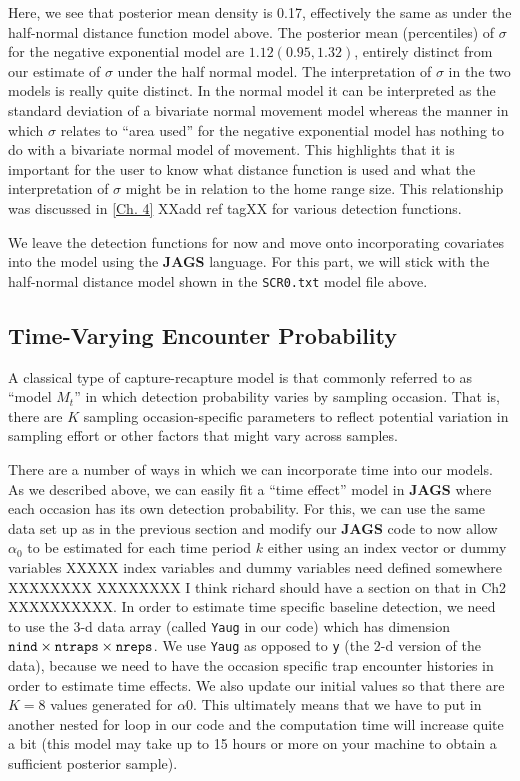 Here, we see that posterior mean density is 0.17,
effectively the same as under the half-normal distance function model
above.  The posterior mean (percentiles) of $\sigma$ for the negative
exponential model are $1.12 (0.95, 1.32)$, entirely distinct from our
estimate of $\sigma$ under the half normal model. The interpretation
of $\sigma$ in the two models is really quite distinct. In the normal
model it can be interpreted as the standard deviation of a bivariate
normal movement model whereas the manner in which $\sigma$ relates to
``area used'' for the negative exponential model has nothing to do
with a bivariate normal model of movement.  This highlights that it is
important for the user to know what distance function is used and what
the interpretation of $\sigma$ might be in relation to the home range size.
This relationship was discussed in \ref{Ch. 4}
XXadd ref tagXX for various detection functions.


We leave the detection functions for now and move onto incorporating
covariates into the model using the {\bf JAGS}
language.  For this part, we will stick with the half-normal distance
model shown in the \mbox{\tt SCR0.txt} model file above.

\subsection{Time-Varying Encounter Probability}

A classical type of capture-recapture model is that commonly referred
to as ``model $M_{t}$'' \citep{otis_etal:1978} in which detection probability varies by
sampling occasion. That is, there are $K$ sampling occasion-specific
parameters to reflect potential variation in sampling effort or other
factors that might vary across samples.

There are a number of ways in which we can incorporate time into our
models.  As we described above, we can easily fit a ``time effect'' model in {\bf JAGS}
where each occasion has its own detection probability.
For this, we can use the same data set up as in the previous
section and modify our {\bf JAGS} code to now allow $\alpha_0$ to be
estimated for each time period $k$ either using an index vector or
dummy variables XXXXX index variables and dummy variables need defined
somewhere XXXXXXXX XXXXXXXX I think richard should have a section on that in Ch2 XXXXXXXXXX.  In order to estimate time
specific baseline detection, we need to use the 3-d data array (called \mbox{\tt Yaug} in our
code) which
has dimension
$\mbox{\tt nind} \times \mbox{\tt ntraps} \times \mbox{\tt nreps}$.
We use \mbox{\tt Yaug} as opposed to \mbox{\tt y} (the 2-d version of the data),
 because we need to have the occasion specific trap
encounter histories in order to estimate time effects.
We also update our
initial values so that there are $K=8$ values generated for $\alpha0$. This
ultimately means that we have to put in another nested for loop in our
code and the computation time will increase quite a bit (this model
may take up to 15 hours or more on your machine to obtain a sufficient
posterior sample).

